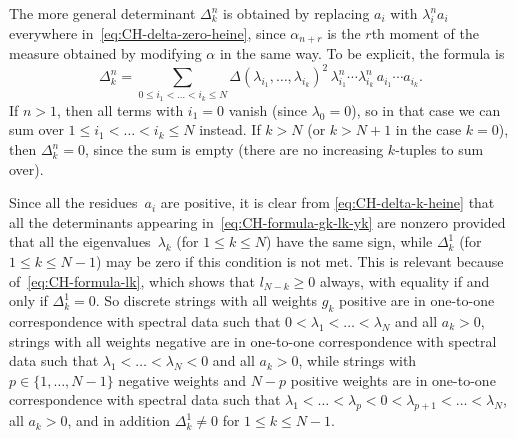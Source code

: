\documentclass[10pt,a4paper]{article} \pdfoutput=1 
\begin{document}
The more general determinant $\Delta_k^n$ is obtained by replacing $a_i$ with $\lambda_i^n a_i$ everywhere
in~\eqref{eq:CH-delta-zero-heine},
since $\alpha_{n+r}$ is the $r$th moment of the measure obtained by modifying $\alpha$
in the same way. To be explicit, the formula is
\begin{equation}
  \label{eq:CH-delta-k-heine}
  \Delta_k^n =
  \sum_{0 \le i_1 < \dots < i_k \le N} \Delta(\lambda_{i_1},\dots,\lambda_{i_k})^2 \, \lambda_{i_1}^n \dotsm \lambda_{i_k}^n \, a_{i_1} \dotsm a_{i_k}
  .
\end{equation}
If $n>1$, then all terms with $i_1=0$ vanish (since $\lambda_0=0$),
so in that case we can sum over $1 \le i_1 < \dots < i_k \le N$ instead.
If $k > N$ (or $k > N+1$ in the case $k=0$), then $\Delta_k^n=0$, since the sum is empty
(there are no increasing $k$-tuples to sum over).

\begin{remark}
  \label{rem:CH-range-of-spectral-map}
  Since all the residues~$a_i$ are positive,
  it is clear from \eqref{eq:CH-delta-k-heine} that all the determinants
  appearing in~\eqref{eq:CH-formula-gk-lk-yk}
  are nonzero provided that all the eigenvalues~$\lambda_k$ (for $1 \le k \le N$)
  have the same sign, while $\Delta_k^1$ (for $1 \le k \le N-1$)
  may be zero if this condition is not met.
  This is relevant because of~\eqref{eq:CH-formula-lk},
  which shows that $l_{N-k} \ge 0$ always, with equality if and only if $\Delta_k^1 = 0$.
  So discrete strings with all weights $g_k$ positive
  are in one-to-one correspondence with spectral data such that
  $0 < \lambda_1 < \dots < \lambda_N$ and all $a_k > 0$,
  strings with all weights negative
  are in one-to-one correspondence with spectral data such that
  $\lambda_1 < \dots < \lambda_N < 0$ and all $a_k > 0$,
  while strings with $p \in \{ 1,\dots,N-1 \}$ negative weights and $N-p$ positive weights
  are in one-to-one correspondence with spectral data such that
  $\lambda_1 < \dots < \lambda_p < 0 < \lambda_{p+1} < \dots < \lambda_N$, all $a_k > 0$,
  and in addition $\Delta_k^1 \neq 0$ for $1 \le k \le N-1$.
\end{remark}
\end{document}
